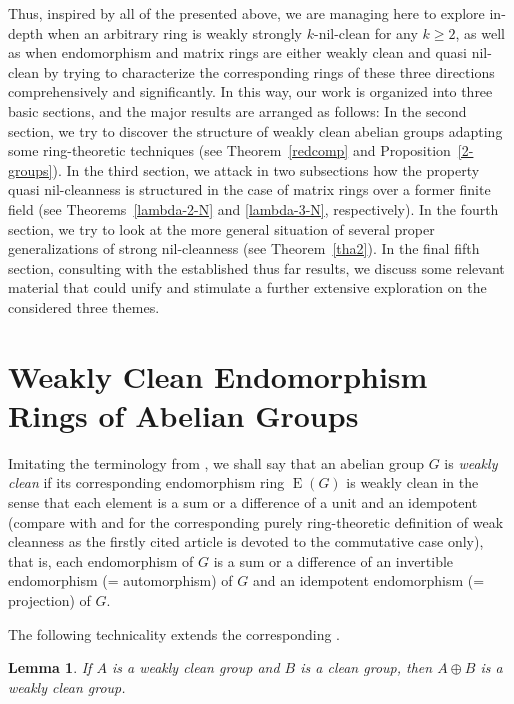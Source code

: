 \documentclass{amsart}
\DeclareMathOperator{\E}{E}
\newtheorem{lemma}[theorem]{Lemma}
\theoremstyle{definition}
\theoremstyle{remark}
\numberwithin{equation}{section}
\begin{document}
\medskip

Thus, inspired by all of the presented above, we are managing here to explore in-depth when an arbitrary ring is weakly strongly $k$-nil-clean for any $k\geq 2$, as well as when endomorphism and matrix rings are either weakly clean and quasi nil-clean by trying to characterize the corresponding rings of these three directions comprehensively and significantly. In this way, our work is organized into three basic sections, and the major results are arranged as follows: In the second section, we try to discover the structure of weakly clean abelian groups adapting some ring-theoretic techniques (see Theorem~\ref{redcomp} and Proposition~\ref{2-groups}). In the third section, we attack in two subsections how the property quasi nil-cleanness is structured in the case of matrix rings over a former finite field (see Theorems~\ref{lambda-2-N} and \ref{lambda-3-N}, respectively). In the fourth section, we try to look at the more general situation of several proper generalizations of strong nil-cleanness (see Theorem~\ref{tha2}). In the final fifth section, consulting with the established thus far results, we discuss some relevant material that could unify and stimulate a further extensive exploration on the considered three themes.

\section{Weakly Clean Endomorphism Rings of Abelian Groups}

Imitating the terminology from \cite{GV}, we shall say that an abelian group $G$ is {\it weakly clean} if its corresponding endomorphism ring $\E(G)$ is weakly clean in the sense that each element is a sum or a difference of a unit and an idempotent (compare with \cite{AA} and \cite{D} for the corresponding purely ring-theoretic definition of weak cleanness as the firstly cited article is devoted to the commutative case only), that is, each endomorphism of $G$ is a sum or a difference of an invertible endomorphism (= automorphism) of $G$ and an idempotent endomorphism (= projection) of $G$.

\medskip

The following technicality extends the corresponding \cite[Lemma 1]{GV}.

\begin{lemma}\label{direct}
If $A$ is a weakly clean group and $B$ is a clean group, then $A\oplus B$ is a weakly clean group.
\end{lemma}
\end{document}
